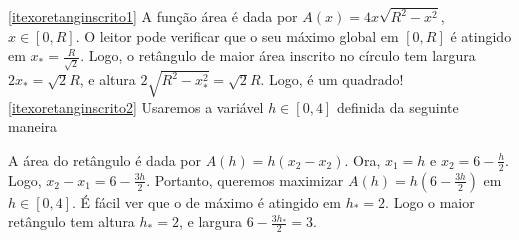 \begin{Solution}{7.5}
 \eqref{itexoretanginscrito1}
A função área é dada por $A(x)=4x\sqrt{R^2-x^2}$, $x\in [0,R]$. O leitor pode
verificar que o seu máximo global em $[0,R]$ é atingido em
$x_*=\frac{R}{\sqrt{2}}$. Logo, o retângulo de maior área inscrito no círculo
tem largura $2x_*=\sqrt{2}R$, e altura $2\sqrt{R^2-x_*^2}=\sqrt{2}R$. Logo, é
um quadrado!
\eqref{itexoretanginscrito2} Usaremos a variável $h\in [0,4]$ definida da
seguinte maneira
\begin{center}
\begin{bmlimage}\end{bmlimage}
\end{center}
A área do retângulo é dada por $A(h)=h(x_2-x_2)$. Ora, $x_1=h$ e
$x_2=6-\frac{h}{2}$. Logo, $x_2-x_1=6-\frac{3h}{2}$. Portanto,
queremos maximizar $A(h)=h(6-\frac{3h}{2})$ em
$h\in [0,4]$.
É fácil ver que o de máximo é atingido em $h_*=2$. Logo o maior retângulo tem
altura $h_*=2$, e largura $6-\frac{3h_*}{2}=3$.
\end{Solution}
